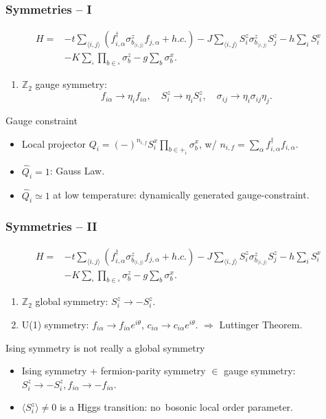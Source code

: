 \documentclass[xcolor=table, 10pt, aspectratio=43]{beamer}
\begin{document}
\begin{frame}
\frametitle{Symmetries -- I}
\begin{align*}
	H= &-t\sum_{\langle i,j \rangle} (f^{\dagger}_{i,\alpha} \sigma^{z}_{b_{\langle i,j \rangle}}f_{j,\alpha} + h.c.)
	-J \sum_{\langle i,j \rangle} S^{z}_{i} \sigma^{z}_{b_{\langle i,j \rangle}} S^{z}_{j} - h \sum_{i} S^{x}_{i}\\
&-K \sum_{\square}\prod_{b\in\square} \sigma^{z}_{b} - g\sum_{b} \sigma^{x}_{b}.
\end{align*}
\begin{enumerate}
\item $\mathbb Z_2$ gauge symmetry:
\[f_{i\alpha}\rightarrow\eta_if_{i\alpha},
\quad S_i^z\rightarrow\eta_iS_i^z,
\quad \sigma_{ij}\rightarrow
\eta_i\sigma_{ij}\eta_j.\]
\end{enumerate}
\begin{block}{Gauge constraint}
\begin{itemize}
\item Local projector $Q_i = (-)^{n_{i,f}}S^{x}_{i}\prod_{b\in +_i}\sigma^{x}_{b}$, w/ $n_{i,f}=\sum_{\alpha}f^{\dagger}_{i,\alpha}f_{i,\alpha}$.
\item $\hat Q_i=1$: Gauss Law.
\item $\hat Q_i\simeq1$ at low temperature: dynamically generated gauge-constraint.
\end{itemize}
\end{block}
\end{frame}

\begin{frame}
\frametitle{Symmetries -- II}
\begin{align*}
	H= &-t\sum_{\langle i,j \rangle} (f^{\dagger}_{i,\alpha} \sigma^{z}_{b_{\langle i,j \rangle}}f_{j,\alpha} + h.c.)
	-J \sum_{\langle i,j \rangle} S^{z}_{i} \sigma^{z}_{b_{\langle i,j \rangle}} S^{z}_{j} - h \sum_{i} S^{x}_{i}\\
&-K \sum_{\square}\prod_{b\in\square} \sigma^{z}_{b} - g\sum_{b} \sigma^{x}_{b}.
\end{align*}
\begin{enumerate}
\item $\mathbb Z_2$ \alert{global} symmetry:
$S_i^z\rightarrow -S_i^z$.
\item U(1) symmetry:
$f_{i\alpha}\rightarrow f_{i\alpha}e^{i\theta}$, $c_{i\alpha}\rightarrow c_{i\alpha}e^{i\theta}$.
$\Rightarrow$ Luttinger Theorem.
\end{enumerate}
\begin{block}{Ising symmetry is not really a global symmetry}
\begin{itemize}
\item Ising symmetry + fermion-parity symmetry $\in$ gauge symmetry:\\
$S_i^z\rightarrow-S_i^z,f_{i\alpha}\rightarrow-f_{i\alpha}$.
\item $\langle S_i^z\rangle\neq0$ is a \alert{Higgs} transition:
no\ bosonic local order parameter.
\end{itemize}
\end{block}
\end{frame}
\end{document}
